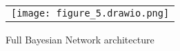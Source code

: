     \begin{figure} [ht]
        \begin{center}
        \begin{tabular}{c} %
        \texttt{[image: figure\_5.drawio.png]}
        \end{tabular}
        \end{center}
        \caption[example] 
        { \label{fig:5_full} Full Bayesian Network architecture}
        \end{figure}